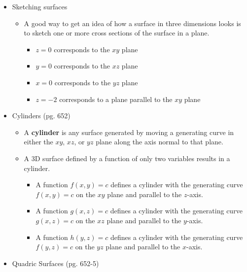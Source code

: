 \documentclass[12pt]{article}
\theoremstyle{plain}
\theoremstyle{definition}
\theoremstyle{remark}
\begin{document}
\begin{itemize}
\item Sketching surfaces

	\begin{itemize}
	\item A good way to get an idea of how a surface in three dimensions looks is to sketch one or more cross sections of the surface in a plane.
		\begin{itemize}
		\item $z=0$ corresponds to the $xy$ plane
		\item $y=0$ corresponds to the $xz$ plane
		\item $x=0$ corresponds to the $yz$ plane
		\item $z=-2$ corresponds to a plane parallel to the $xy$ plane
		\end{itemize}
	\end{itemize}

\item Cylinders (pg. 652)

	\begin{itemize}
	\item A \textbf{cylinder} is any surface generated by moving a generating curve  in either the $xy$, $xz$, or $yz$ plane along the axis normal to that plane.
	\item A 3D surface defined by a function of only two variables results in a cylinder.
		\begin{itemize}
		\item A function $f(x,y)=c$ defines a cylinder with the generating curve $f(x,y)=c$ on the $xy$ plane and parallel to the $z$-axis.
		\item A function $g(x,z)=c$ defines a cylinder with the generating curve $g(x,z)=c$ on the $xz$ plane and parallel to the $y$-axis.
		\item A function $h(y,z)=c$ defines a cylinder with the generating curve $f(y,z)=c$ on the $yz$ plane and parallel to the $x$-axis.
		\end{itemize}
	\end{itemize}
\item Quadric Surfaces (pg. 652-5)


\end{itemize}
\end{document}

